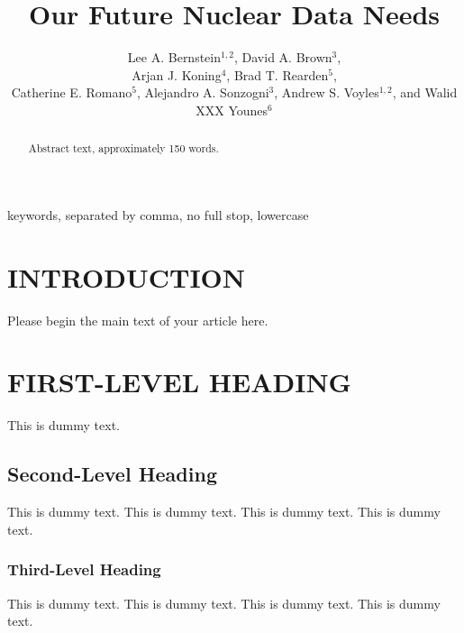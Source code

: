 \documentclass[letterpaper]{ar-1col}
\begin{document}

\title{Our Future Nuclear Data Needs}


\author{Lee A. Bernstein$^{1,2}$, David A. Brown$^3$, \\Arjan J. Koning$^4$, Brad T. Rearden$^5$,  \\Catherine E. Romano$^5$, Alejandro A. Sonzogni$^3$, Andrew S. Voyles$^{1,2}$, and Walid XXX Younes$^6$
}

\begin{abstract}
Abstract text, approximately 150 words. 
\end{abstract}

\begin{keywords}
keywords, separated by comma, no full stop, lowercase
\end{keywords}
\maketitle

\tableofcontents


\section{INTRODUCTION}
Please begin the main text of your article here. 



\section{FIRST-LEVEL HEADING}
This is dummy text. 
\subsection{Second-Level Heading}
This is dummy text. This is dummy text. This is dummy text. This is dummy text.

\subsubsection{Third-Level Heading}
This is dummy text. This is dummy text. This is dummy text. This is dummy text. 
\end{document}

